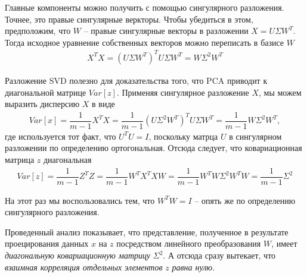 \documentclass[%
	11pt,
	a4paper,
	utf8,
]{article}
\begin{document}
Главные компоненты можно получить с помощью сингулярного разложения. Точнее, это правые сингулярные веркторы. Чтобы убедиться в этом, предположим, что $ W $ -- правые сингулярные векторы в разложении $ X = U \Sigma W^T $. Тогда исходное уравнение собственных векторов можно переписать в базисе $ W $
\begin{align*}
	X^T X = (U \Sigma W^T)^T U \Sigma W^T = W \Sigma^2 W^T
\end{align*}

Разложение SVD полезно для доказательства того, что PCA приводит к диагональной матрице $ Var[z] $. Применяя сингулярное разложение $ X $, мы можем выразить дисперсию $ X $ в виде
\begin{align*}
	Var[x] = \dfrac{1}{m - 1} X^T X = \dfrac{1}{m - 1} (U \Sigma^2 W^T)^T U \Sigma W^T = \dfrac{1}{m - 1} W \Sigma^2 W^T,
\end{align*}
где используется тот факт, что $ U^T U = I $, поскольку матрца $ U $ в сингулярном разложении по определению ортогональная. Отсюда следует, что ковариационная матрица $ z $ диагональная
\begin{align*}
	Var[z] = \dfrac{1}{m - 1} Z^T Z = \dfrac{1}{m - 1}W^T X^T X W = \dfrac{1}{m-1} W^T W \Sigma^2 W^T W = \dfrac{1}{m - 1}\Sigma^2
\end{align*}

На этот раз мы воспользовались тем, что $ W^T W = I $ -- опять же по определению сингулярного разложения.

Проведенный анализ показывает, что {\color{blue}представление, полученное в результате проецирования данных $ x $ на $ z $ посредством линейного преобразования $ W $, имеет \emph{диагональную ковариационную матрицу} $ \Sigma^2 $. А отсюда сразу вытекает, что \emph{взаимная корреляция отдельных элементов} $ z $ \emph{равна нулю}.}





\begin{thebibliography}{99}
	
\end{thebibliography}


\end{document}
